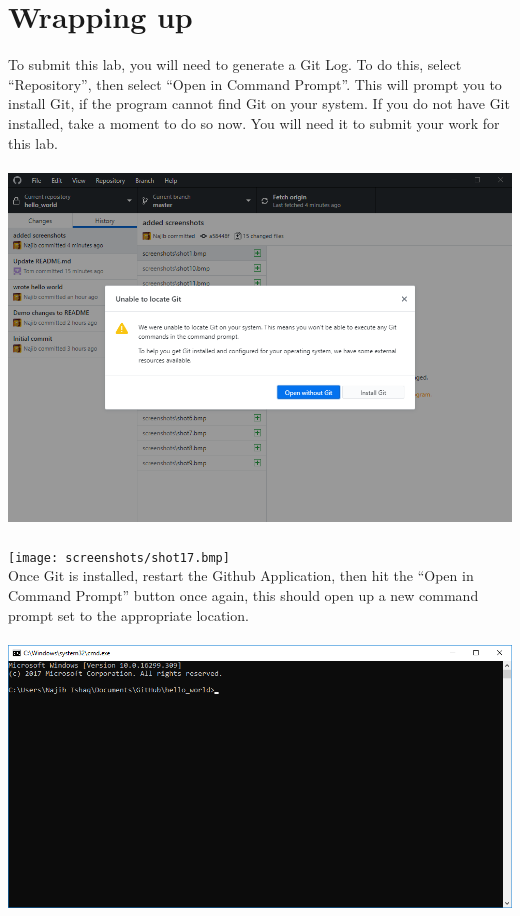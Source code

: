 \documentclass[12pt, letter]{article}
\begin{document}
    \section{Wrapping up}
    To submit this lab, you will need to generate a Git Log. To do this, select ``Repository'', then select ``Open in Command Prompt''. This will prompt you to install Git, if the program cannot find Git on your system. If you do not have Git installed, take a moment to do so now. You will need it to submit your work for this lab. \\ \\ %
    \includegraphics{screenshots/shot16.bmp} \\ \\
    \texttt{[image: screenshots/shot17.bmp]}
    \\
    Once Git is installed, restart the Github Application, then hit the ``Open in Command Prompt'' button once again, this should open up a new command prompt set to the appropriate location. \\ \\
    \includegraphics{screenshots/shot18.bmp}
\end{document}
